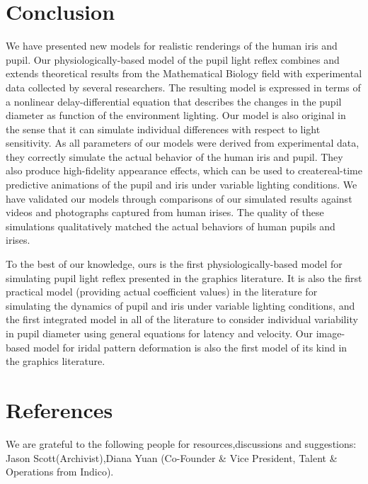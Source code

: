 \documentclass{acmtog} %
\begin{document}
\section{Conclusion}
\label{sec:conclusion}
%
We have presented new models for realistic renderings of the human iris
and pupil. Our physiologically-based model of the pupil light reflex
combines and extends theoretical results from the Mathematical Biology
field with experimental data collected by several researchers. The
resulting model is expressed in terms of a nonlinear delay-differential
equation that describes the changes in the pupil diameter as function of
the environment lighting. Our model is also original in the sense that
it can simulate individual differences with respect to light
sensitivity. As all parameters of our models were derived from
experimental data, they correctly simulate the actual behavior of the
human iris and pupil. They also produce high-fidelity appearance
effects, which can be used to create\break real-time predictive
animations of the pupil and iris under variable lighting conditions. We
have validated our models through comparisons of our simulated results
against videos and photographs captured from human irises. The quality
of these simulations qualitatively matched the actual behaviors of human
pupils and irises.

To the best of our knowledge, ours is the first physiologically-based
model for simulating pupil light reflex presented in the graphics
literature. It is also the first practical model (providing actual
coefficient values) in the literature for simulating the dynamics of
pupil and iris under variable lighting conditions, and the first
integrated model in all of the literature to consider individual
variability in pupil diameter using general equations for latency and
velocity. Our image-based model for iridal pattern deformation is also
the first model of its kind in the graphics literature.\vskip21pt

\section{References}

\begin{acks}
We are grateful to the following people for resources,discussions and suggestions: Jason Scott(Archivist),Diana Yuan (Co-Founder & Vice President, Talent & Operations from Indico).
\end{acks}





\end{document}

